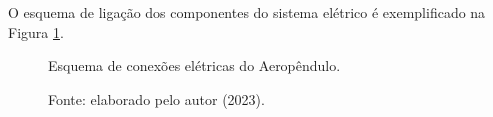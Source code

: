 O esquema de ligação dos componentes do sistema elétrico é exemplificado na Figura \ref{fig3:image_12}.

\begin{figure}[!h]
	\centering
    	\caption{Esquema de conexões elétricas do Aeropêndulo.}
	\caption*{Fonte: elaborado pelo autor (2023).}
	\label{fig3:image_12}
\end{figure}

\vspace{2cm}
